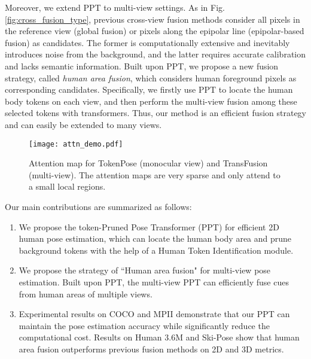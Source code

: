 \documentclass[runningheads]{llncs}
\begin{document}
Moreover, we extend PPT to multi-view settings. 
As in Fig.\ref{fig:cross_fusion_type}, previous cross-view fusion methods consider all pixels in the reference view (global fusion) or pixels along the epipolar line (epipolar-based fusion) as candidates. 
The former is computationally extensive and inevitably introduces noise from the background, and the latter requires accurate calibration and lacks semantic information. 
Built upon PPT, we propose a new fusion strategy, called \textit{human area fusion}, which considers  human foreground pixels as corresponding candidates.
Specifically, we firstly use PPT to locate the human body tokens on each view, and then perform the multi-view fusion among these selected tokens with transformers. Thus, our method is an efficient fusion strategy and can easily be extended to many views. 


\begin{figure}[t]
    \centering
    \texttt{[image: attn\_demo.pdf]}
    \caption{\small{Attention map for TokenPose (monocular view) and TransFusion (multi-view). The attention maps are very sparse and only attend to a small local regions.}}
    \label{fig:attn_map_demo}
\end{figure}


Our main contributions are summarized as follows:
\begin{enumerate}
    
    \item We propose the token-Pruned Pose Transformer (PPT) for efficient 2D human pose estimation, which can locate the human body area and prune background tokens with the help of a Human Token Identification module. 
    
    \item We propose the strategy of ``Human area fusion" for multi-view pose estimation. Built upon PPT, the multi-view PPT can efficiently fuse cues from human areas of multiple views. 
    
    \item Experimental results on COCO and MPII demonstrate that our PPT can maintain the pose estimation accuracy while significantly reduce the computational cost. Results on Human 3.6M and Ski-Pose show that human area fusion outperforms previous fusion methods on 2D and 3D metrics. 
    
\end{enumerate}
\end{document}
